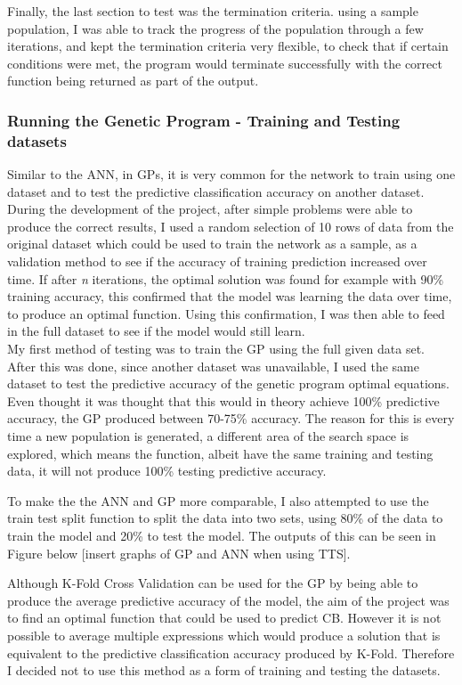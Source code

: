 \documentclass[11pt]{article}
\begin{document}
Finally, the last section to test was the termination criteria. using a sample population, I was able to track the progress of the population through a few iterations, and kept the termination criteria very flexible, to check that if certain conditions were met, the program would terminate successfully with the correct function being returned as part of the output. 

\subsubsection{Running the Genetic Program - Training and Testing datasets}
Similar to the ANN, in GPs, it is very common for the network to train using one dataset and to test the predictive classification accuracy on another dataset. During the development of the project, after simple problems were able to produce the correct results, I used a random selection of 10 rows of data from the original dataset which could be used to train the network as a sample, as a validation method to see if the accuracy of training prediction increased over time. If after \textit{n} iterations, the optimal solution was found for example with 90\% training accuracy, this confirmed that the model was learning the data over time, to produce an optimal function. Using this confirmation, I was then able to feed in the full dataset to see if the model would still learn. \\
My first method of testing was to train the GP using the full given data set. After this was done, since another dataset was unavailable, I used the same dataset to test the predictive accuracy of the genetic program optimal equations. Even thought it was thought that this would in theory achieve 100\% predictive accuracy, the GP produced between 70-75\% accuracy. The reason for this is every time a new population is generated, a different area of the search space is explored, which means the function, albeit have the same training and testing data, it will not produce 100\% testing predictive accuracy. 

To make the the ANN and GP more comparable, I also attempted to use the train test split function to split the data into two sets, using 80\% of the data to train the model and 20\% to test the model. The outputs of this can be seen in Figure below [insert graphs of GP and ANN when using TTS]. 

Although K-Fold Cross Validation can be used for the GP by being able to produce the average predictive accuracy of the model, the aim of the project was to find an optimal function that could be used to predict CB. However it is not possible to average multiple expressions which would produce a solution that is equivalent to the predictive classification accuracy produced by K-Fold. Therefore I decided not to use this method as a form of training and testing the datasets. 
\end{document}
